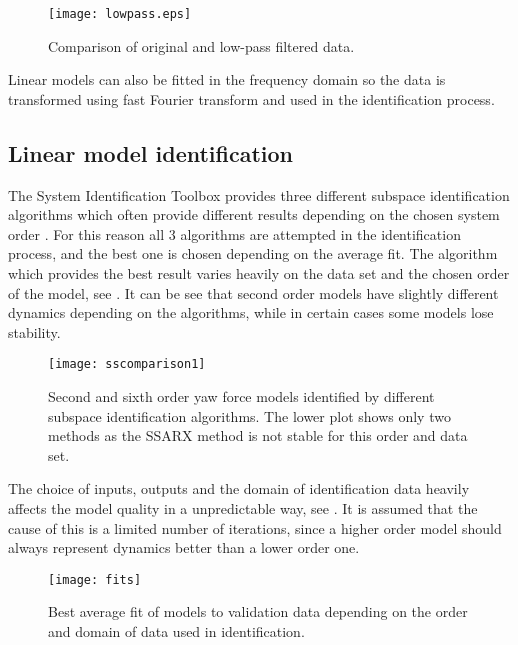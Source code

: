 {\begin{figure}[H]
\centering
\texttt{[image: lowpass.eps]}
\caption{Comparison of original and low-pass filtered data.}
\label{figlowpass}
\end{figure}

Linear models can also be fitted in the frequency domain so the data is transformed using fast Fourier transform \cite{van1992computational} and used in the identification process.

\subsection{Linear model identification}
The System Identification Toolbox provides three different subspace identification algorithms which often provide different results depending on the chosen system order \cite{van1994n4sid}. 
For this reason all 3 algorithms are attempted in the identification process, and the best one is chosen depending on the average fit.
The algorithm which provides the best result varies heavily on the data set and the chosen order of the model, see .
It can be see that second order models have slightly different dynamics depending on the algorithms, while in certain cases some models lose stability.

\begin{figure}[H]
\centering
\hspace{-2em}\texttt{[image: sscomparison1]}
\caption{Second and sixth order yaw force models identified by different subspace identification algorithms. 
The lower plot shows only two methods as the SSARX method is not stable for this order and data set.}
\label{fig:ssid1}
\end{figure}

The choice of inputs, outputs and the domain of identification data heavily affects the model quality in a unpredictable way, see .
It is assumed that the cause of this is a limited number of iterations, since a higher order model should always represent dynamics better than a lower order one.

\begin{figure}[H]
\hspace{-2.5em}\texttt{[image: fits]}
\caption{Best average fit of models to validation data depending on the order and domain of data used in identification.}
\label{fig:fits}
\end{figure}

}

